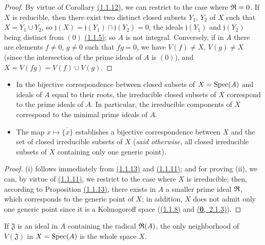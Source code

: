 \begin{proof}
\label{proof-prop-1.1.1.13}
By virtue of Corollary \hyperref[cor-1.1.1.12]{(1.1.12)}, we can restrict to the case where
$\mathfrak{R}=0$. If $X$ is reducible, then there exist two distinct closed subsets $Y_1$, $Y_2$
of $X$ such that $X=Y_1\cup Y_2$,
so $\mathfrak{j}(X)=\mathfrak{j}(Y_1)\cap\mathfrak{j}(Y_2)=0$, the ideals $\mathfrak{j}(Y_1)$
and $\mathfrak{j}(Y_2)$ being distinct from $(0)$ \hyperref[cor-1.1.1.5]{(1.1.5)}; so
$A$ is not integral. Conversely, if in $A$ there are elements $f\neq 0$, $g\neq 0$ such
that $fg=0$, we have $V(f)\neq X$, $V(g)\neq X$ (since the intersection of the prime ideals
of $A$ is $(0)$), and $X=V(fg)=V(f)\cup V(g)$.
\end{proof}

\begin{cor}[1.1.14]
\label{cor-1.1.1.14}
\medskip\noindent
\begin{itemize}
  \item[{\rm(i)}] In the bijective correspondence between closed subsets of $X={\mathop{\mathrm{Spec}}\nolimits}(A)$
        and ideals of $A$ equal to their roots, the irreducible closed subsets
        of $X$ correspond to the prime ideals of $A$. In particular, the irreducible
        components of $X$ correspond to the minimal prime ideals of $A$.
  \item[{\rm(ii)}] The map $x\mapsto\overline{\{x\}}$ establishes a bijective correspondence
        between $X$ and the set of closed irreducible subsets of $X$
        ({\it said otherwise,} all closed irreducible subsets of $X$ containing
        only one generic point).
\end{itemize}
\end{cor}

\begin{proof}
\label{proof-cor-1.1.1.14}
(i) follows immediately from \hyperref[prop-1.1.1.13]{(1.1.13)} and
\hyperref[prop-1.1.1.11]{(1.1.11)}; and for
proving (ii), we can, by virtue of \hyperref[prop-1.1.1.11]{(1.1.11)}, we restrict to the
case where $X$ is irreducible; then, according to
Proposition \hyperref[prop-1.1.1.13]{(1.1.13)}, there exists
in $A$ a smaller prime ideal $\mathfrak{R}$, which corresponds to the generic point
of $X$; in addition, $X$ does not admit only one generic point since it is a Kolmogoroff
space (\hyperref[cor-1.1.1.8]{(1.1.8)} and \hyperref[env-0.2.1.3]{(\textbf{0},~2.1.3)}).
\end{proof}

\begin{prop}[1.1.15]
\label{prop-1.1.1.15}
If $\mathfrak{J}$ is an ideal in $A$ containing the radical $\mathfrak{R}(A)$, the only
neighborhood of $V(\mathfrak{J})$ in $X={\mathop{\mathrm{Spec}}\nolimits}(A)$ is the whole space $X$.
\end{prop}

